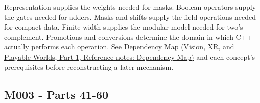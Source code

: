 \hypertarget{appendix-fd090d982a15-why-these-dependencies-matter}{}

Representation supplies the weights needed for masks. Boolean operators supply the gates needed for adders. Masks and shifts supply the field operations needed for compact data. Finite width supplies the modular model needed for two's complement. Promotions and conversions determine the domain in which C++ actually performs each operation. See \href{../07-Vision-XR-and-Playable-Worlds-P01/main.pdf\#appendix-4ad47bdd269a}{Dependency Map (Vision, XR, and Playable Worlds, Part 1, Reference notes: Dependency Map)} and each concept's prerequisites before reconstructing a later mechanism.

\subsection{M003 - Parts 41-60}\label{appendix-fd090d982a15-m003---parts-41-60}

\hypertarget{appendix-fd090d982a15-m003---parts-41-60}{}

